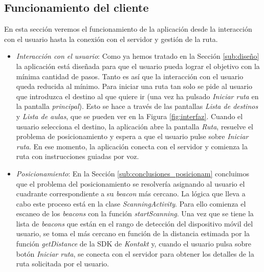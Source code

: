 \subsection{Funcionamiento del cliente}
\label{sub:func_cliente}
En esta sección veremos el funcionamiento de la aplicación desde la interacción con el usuario hasta la conexión con el servidor y gestión de la ruta. 

\begin{itemize}
	\item \textit{Interacción con el usuario}: Como ya hemos tratado en la Sección \ref{sub:diseño} la aplicación está diseñada para que el usuario pueda lograr el objetivo con la mínima cantidad de pasos. Tanto es así que la interacción con el usuario queda reducida al mínimo. Para iniciar una ruta tan solo se pide al usuario que introduzca el destino al que quiere ir (una vez ha pulsado \textit{Iniciar ruta} en la pantalla \textit{principal}). Esto se hace a través de las pantallas \textit{Lista de destinos} y \textit{Lista de aulas}, que se pueden ver en la Figura \ref{fig:interfaz}. Cuando el usuario selecciona el destino, la aplicación abre la pantalla \textit{Ruta}, resuelve el problema de posicionamiento y espera a que el usuario pulse sobre \textit{Iniciar ruta}. En ese momento, la aplicación conecta con el servidor y comienza la ruta con instrucciones guiadas por voz.
	
	\item \textit{Posicionamiento}: En la Sección \ref{sub:conclusiones_posicionam} concluimos que el problema del posicionamiento se resolvería asignando al usuario el cuadrante correspondiente a su \textit{beacon} más cercano. La lógica que lleva a cabo este proceso está en la clase \textit{ScanningActivity}. Para ello comienza el escaneo de los \textit{beacons} con la función \textit{startScanning}. Una vez que se tiene la lista de \textit{beacons} que están en el rango de detección del dispositivo móvil del usuario, se toma el más cercano en función de la distancia estimada por la función \textit{getDistance} de la SDK de \textit{Kontakt} y, cuando el usuario pulsa sobre botón \textit{Iniciar ruta}, se conecta con el servidor para obtener los detalles de la ruta solicitada por el usuario. 
	

\end{itemize}
